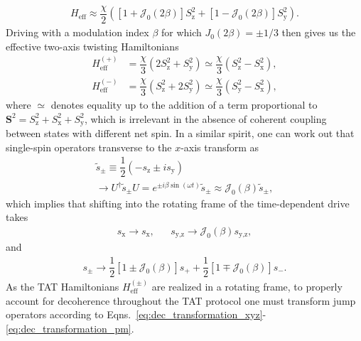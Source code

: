 \documentclass[aps,prx,superscriptaddress,notitlepage,twocolumn,longbibliography]{revtex4-1}
\renewcommand{\t}{\text} %
\newcommand{\f}[2]{\dfrac{#1}{#2}} %
\newcommand{\p}[1]{\left(#1\right)} %
\renewcommand{\sp}[1]{\left[#1\right]} %
\renewcommand{\v}{\bm} %
\newcommand{\J}{\mathcal{J}}
\newcommand{\z}{\text{z}}
\newcommand{\x}{\text{x}}
\newcommand{\y}{\text{y}}
\begin{document}
\begin{align}
  H_{\t{eff}}
  \approx \f{\chi}{2} \p{\sp{1+\J_0\p{2\beta}} S_\z^2
  + \sp{1-\J_0\p{2\beta}} S_\y^2}.
\end{align}
Driving with a modulation index $\beta$ for which $J_0\p{2\beta}=\pm1/3$ then gives us the effective two-axis twisting Hamiltonians
\begin{align}
  H_{\t{eff}}^{(+)}
  &= \f{\chi}{3} \p{2 S_\z^2 + S_\y^2}
  \simeq \f{\chi}{3} \p{S_\z^2 - S_\x^2}, \\
  H_{\t{eff}}^{(-)}
  &= \f{\chi}{3} \p{S_\z^2 + 2 S_\y^2}
  \simeq \f{\chi}{3} \p{S_\y^2 - S_\x^2},
\end{align}
where $\simeq$ denotes equality up to the addition of a term proportional to $\v S^2=S_\z^2+S_\x^2+S_\y^2$, which is irrelevant in the absence of coherent coupling between states with different net spin.
In a similar spirit, one can work out that single-spin operators transverse to the $x$-axis transform as
\begin{multline}
  \tilde s_\pm
  \equiv \f12\p{-s_\z\pm i s_\y} \\
  \to U^\dag \tilde s_\pm U
  = e^{\pm i\beta\sin\p{\omega t}} \tilde s_\pm
  \approx \J_0\p{\beta} \tilde s_\pm,
\end{multline}
which implies that shifting into the rotating frame of the time-dependent drive takes
\begin{align}
  s_\x \to s_\x,
  &&
  s_{\y,\z} \to \J_0\p{\beta} s_{\y,\z},
  \label{eq:dec_transformation_xyz}
\end{align}
and
\begin{align}
  s_\pm
  \to \f12\sp{1 \pm \J_0\p{\beta}} s_+
  + \f12\sp{1 \mp \J_0\p{\beta}} s_-.
  \label{eq:dec_transformation_pm}
\end{align}
As the TAT Hamiltonians $H_{\t{eff}}^{(\pm)}$ are realized in a rotating frame, to properly account for decoherence throughout the TAT protocol one must transform jump operators according to Eqns.~\eqref{eq:dec_transformation_xyz}-\eqref{eq:dec_transformation_pm}.
\end{document}
